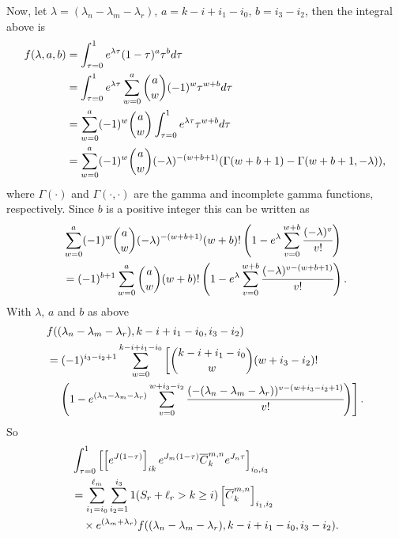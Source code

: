 \documentclass{article}
\begin{document}
Now, let \(\lambda = (\lambda_n-\lambda_m-\lambda_r),\, a=k-i+i_1-i_0,\, b=i_3-i_2\), then the integral above is 
\begin{align}
    f(\lambda, a, b)&=\int_{\tau=0}^1e^{\lambda \tau} (1-\tau)^{a}\tau^{b}d\tau
    \\&=\int_{\tau=0}^1e^{\lambda \tau} \sum_{w=0}^a\binom{a}{w}(-1)^w\tau^{w+b}d\tau
    \\&= \sum_{w=0}^a(-1)^w\binom{a}{w}\int_{\tau=0}^1e^{\lambda \tau}\tau^{w+b}d\tau
    \\&= \sum_{w=0}^a(-1)^w\binom{a}{w}(-\lambda)^{-(w+b+1)}(\Gamma(w+b+1)-\Gamma(w+b+1,-\lambda)),
\end{align}
where \(\Gamma(\cdot)\) and \(\Gamma(\cdot, \cdot)\) are the gamma and incomplete gamma functions, respectively. Since \(b\) is a positive integer this can be written as 
\begin{align}
    &\sum_{w=0}^a(-1)^w\binom{a}{w}(-\lambda)^{-(w+b+1)}(w+b)!\left(1 - e^{\lambda}\sum_{v=0}^{w+b}\cfrac{(-\lambda)^v}{v!}\right)
    \\&= (-1)^{b+1}\sum_{w=0}^a\binom{a}{w}(w+b)!\left(1 - e^{\lambda}\sum_{v=0}^{w+b}\cfrac{(-\lambda)^{v-(w+b+1)}}{v!}\right).
\end{align}
With \(\lambda,\, a\) and \(b\) as above
\begin{align}
    &f((\lambda_n-\lambda_m-\lambda_r), k-i+i_1-i_0, i_3-i_2)
    \\&=(-1)^{i_3-i_2+1}\sum_{w=0}^{k-i+i_1-i_0}\left[\binom{k-i+i_1-i_0}{w}(w+i_3-i_2)!\right.\\&\quad\left.\left(1 - e^{(\lambda_n-\lambda_m-\lambda_r)}\sum_{v=0}^{w+i_3-i_2}\cfrac{(-(\lambda_n-\lambda_m-\lambda_r))^{v-(w+i_3-i_2+1)}}{v!}\right)\right].
\end{align}
So 
\begin{align}
    &\int_{\tau=0}^1\left[\left[e^{J(1-\tau)}\right]_{ik} e^{J_m(1-\tau)} \overline{C}_k^{m,n} e^{J_n\tau} \right]_{i_0,i_3}
    \\&=\sum_{i_1=i_0}^{\ell_m}\sum_{i_2=1}^{i_3}1(S_r+\ell_{r}> k\geq i)\left[\overline{C}_k^{m,n}\right]_{i_1,i_2}
    \\&\quad\times e^{(\lambda_m+\lambda_r)}f((\lambda_n-\lambda_m-\lambda_r), k-i+i_1-i_0, i_3-i_2).
\end{align}
\end{document}
